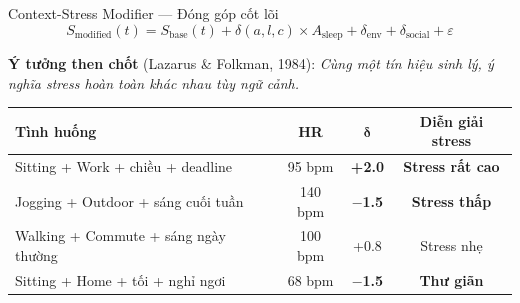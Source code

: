 \documentclass[11pt]{beamer}
\begin{document}
\begin{frame}{Context-Stress Modifier --- Đóng góp cốt lõi}
\small
\begin{equation*}
\boxed{S_{\text{modified}}(t) = S_{\text{base}}(t) + \delta(a,l,c) \times A_{\text{sleep}} + \delta_{\text{env}} + \delta_{\text{social}} + \varepsilon}
\end{equation*}

\vspace{0.1cm}
\textbf{Ý tưởng then chốt} (Lazarus \& Folkman, 1984): \textit{Cùng một tín hiệu sinh lý, ý nghĩa stress hoàn toàn khác nhau tùy ngữ cảnh.}

\vspace{0.1cm}
\begin{table}[h]
\centering
\scriptsize
\begin{tabular}{lccc}
\toprule
\textbf{Tình huống} & \textbf{HR} & $\boldsymbol{\delta}$ & \textbf{Diễn giải stress} \\
\midrule
\textcolor{alertred}{Sitting + Work + chiều + deadline} & 95 bpm & \textcolor{alertred}{\textbf{+2.0}} & \textcolor{alertred}{\textbf{Stress rất cao}} \\
\textcolor{breakthroughgreen}{Jogging + Outdoor + sáng cuối tuần} & 140 bpm & \textcolor{breakthroughgreen}{\textbf{$-$1.5}} & \textcolor{breakthroughgreen}{\textbf{Stress thấp}} \\
Walking + Commute + sáng ngày thường & 100 bpm & +0.8 & Stress nhẹ \\
\textcolor{breakthroughgreen}{Sitting + Home + tối + nghỉ ngơi} & 68 bpm & \textcolor{breakthroughgreen}{\textbf{$-$1.5}} & \textcolor{breakthroughgreen}{\textbf{Thư giãn}} \\
\bottomrule
\end{tabular}
\end{table}

\vspace{0.1cm}
\end{frame}

\end{document}
